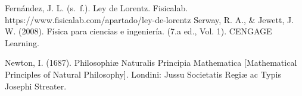 \documentclass{article}
\begin{document}
\begin{thebibliography}{9}						%
 Fernández, J. L. (s. f.). Ley de Lorentz. Fisicalab. https://www.fisicalab.com/apartado/ley-de-lorentz
	Serway, R. A., $\&$ Jewett, J. W. (2008). Física para ciencias e ingeniería. (7.a
ed., Vol. 1). CENGAGE Learning.

	Newton, I. (1687). Philosophiæ Naturalis Principia Mathematica [Mathematical Principles of Natural Philosophy]. Londini: Jussu Societatis Regiæ ac Typis Josephi Streater.

\end{thebibliography}
\end{document}
